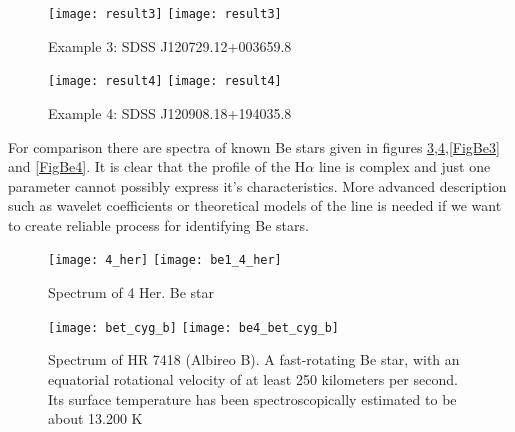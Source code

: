    \begin{figure}[!htbp]
      \begin{center}
        \leavevmode
        \ifpdf
        \texttt{[image: result3]}
        \else
        \texttt{[image: result3]}
        \fi
        \caption{Example 3: SDSS J120729.12+003659.8}
        \label{FigResult3}
      \end{center}
    \end{figure}

   \begin{figure}[!htbp]
      \begin{center}
        \leavevmode
        \ifpdf
        \texttt{[image: result4]}
        \else
        \texttt{[image: result4]}
        \fi
        \caption{Example 4: SDSS J120908.18+194035.8 }
        \label{FigResult4}
      \end{center}
    \end{figure}

 
    For comparison there are spectra of known Be stars given in
    figures \ref{FigBe1},\ref{FigBe2},\ref{FigBe3} and
    \ref{FigBe4}. It is clear that the profile of the H$\alpha$ line
    is complex and just one parameter cannot possibly express it's
    characteristics. More advanced description such as wavelet
    coefficients or theoretical models of the line is needed if we
    want to create reliable process for identifying Be stars.

   \begin{figure}[!htbp]
      \begin{center}
        \leavevmode
        \ifpdf
        \texttt{[image: 4\_her]}
        \else
        \texttt{[image: be1\_4\_her]}
        \fi
        \caption{Spectrum of 4 Her. Be star}
        \label{FigBe1}
      \end{center}
    \end{figure}

   \begin{figure}[!htbp]
      \begin{center}
        \leavevmode
        \ifpdf
        \texttt{[image: bet\_cyg\_b]}
        \else
        \texttt{[image: be4\_bet\_cyg\_b]}
        \fi
        \caption{Spectrum of HR 7418 (Albireo B). A fast-rotating Be
          star, with an equatorial rotational velocity of at least 250
          kilometers per second. Its surface temperature has been
          spectroscopically estimated to be about 13.200 K }
        \label{FigBe2}
      \end{center}
    \end{figure}

